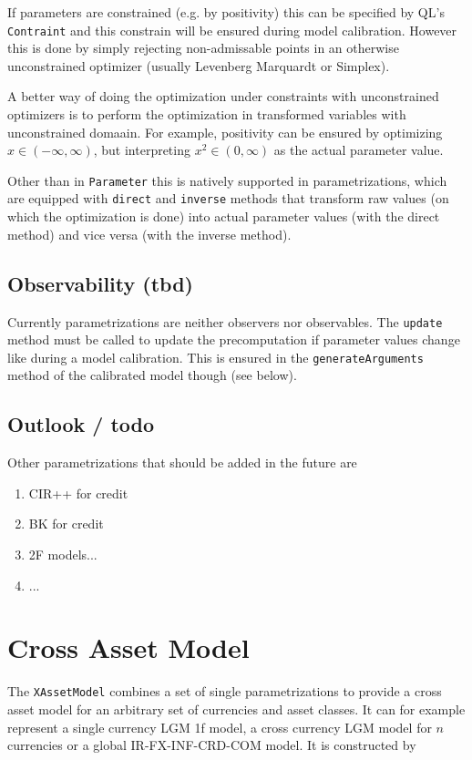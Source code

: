 \documentclass[12pt, a4paper]{article}
\begin{document}
If parameters are constrained (e.g. by positivity) this can be specified by QL's \verb+Contraint+ and this constrain will be ensured during model calibration. However this is done by simply rejecting non-admissable points in an otherwise unconstrained optimizer (usually Levenberg Marquardt or Simplex).

A better way of doing the optimization under constraints with unconstrained optimizers is to perform the optimization in transformed variables with unconstrained domaain. For example, positivity can be ensured by optimizing $x\in(-\infty,\infty)$, but interpreting $x^2\in(0,\infty)$ as the actual parameter value.

Other than in \verb+Parameter+ this is natively supported in parametrizations, which are equipped with \verb+direct+ and \verb+inverse+ methods that transform raw values (on which the optimization is done) into actual parameter values (with the direct method) and vice versa (with the inverse method).

\subsection{Observability (tbd)}

Currently parametrizations are neither observers nor observables. The \verb+update+ method must be called to update the precomputation if parameter values change like during a model calibration. This is ensured in the \verb+generateArguments+ method of the calibrated model though (see below).

\subsection{Outlook / todo}

Other parametrizations that should be added in the future are

\begin{enumerate}
\item CIR++ for credit
\item BK for credit
\item 2F models...
\item ...
\end{enumerate}

\section{Cross Asset Model}

The \verb+XAssetModel+ combines a set of single parametrizations to provide a cross asset model for an arbitrary set of currencies and asset classes. It can for example represent a single currency LGM 1f model, a cross currency LGM model for $n$ currencies or a global IR-FX-INF-CRD-COM model. It is constructed by
\end{document}
